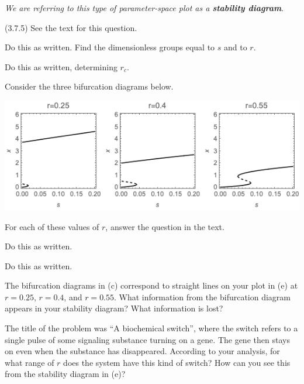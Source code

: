 \documentclass[12pt,letterpaper]{exam}
\begin{document}
\begin{questions}
\begin{parts}
\begin{itemize}
\end{itemize}
 
  

\emph{We are referring to this type of parameter-space plot as a \textbf{stability diagram}}.
\end{parts}


\question (3.7.5)  See the text for this question.  
\begin{parts}
\item Do this as written.  Find the dimensionless groups equal to $s$ and to $r$.
\item Do this as written, determining $r_c$.
\item Consider the three bifurcation diagrams below.

\hspace{-0.6in}\includegraphics[width=\textwidth]{img/PSet02-375switch-bifn.png}

For each of these values of $r$, answer the question in the text.

\item Do this as written.

\item Do this as written.

\item The bifurcation diagrams in (c) correspond to straight lines on your plot in (e) at $r = 0.25$, $r=0.4$, and $r=0.55$.  What information from the bifurcation diagram appears in your stability diagram?  What information is lost?

\item The title of the problem was ``A biochemical switch'', where the switch refers to a single pulse of some signaling substance turning on a gene.  The gene then stays on even when the substance has disappeared.  According to your analysis, for what range of $r$ does the system have this kind of switch?  How can you see this from the stability diagram in (e)?

\end{parts}




\end{questions}
\end{document}
